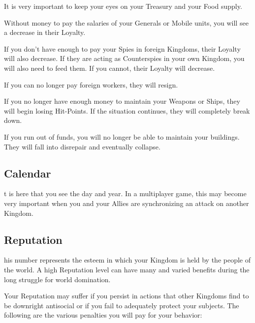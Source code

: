 It is very important to keep your eyes on your Treasury and your Food supply.

Without money to pay the salaries of your Generals or Mobile units, you will see a decrease in their Loyalty.

If you don’t have enough to pay your Spies in foreign Kingdoms, their Loyalty will also decrease. If they are acting as Counterspies in your own Kingdom, you will also need to feed them. If you cannot, their Loyalty will decrease.

If you can no longer pay foreign workers, they will resign.

If you no longer have enough money to maintain your Weapons or Ships, they will begin losing Hit-Points. If the situation continues, they will completely break down.

If you run out of funds, you will no longer be able to maintain your buildings. They will fall into disrepair and eventually collapse.

\subsection{\textsf{Calendar}}


t is here that you see the day and year. In a multiplayer game, this may become very important when you and your Allies are synchronizing an attack on another Kingdom.

\subsection{\textsf{Reputation}}


his number represents the esteem in which your Kingdom is held by the people of the world. A high Reputation level can have many and varied benefits during the long struggle for world domination.

Your Reputation may suffer if you persist in actions that other Kingdoms find to be downright antisocial or if you fail to adequately protect your subjects. The following are the various penalties you will pay for your behavior:

